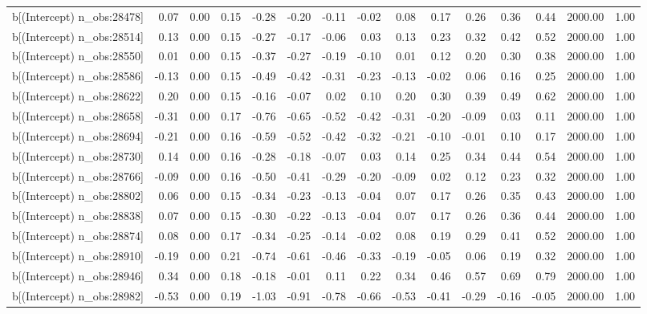 \begin{table}[ht]
\begin{tabular}{rrrrrrrrrrrrrrr}
  b[(Intercept) n\_obs:28478] & 0.07 & 0.00 & 0.15 & -0.28 & -0.20 & -0.11 & -0.02 & 0.08 & 0.17 & 0.26 & 0.36 & 0.44 & 2000.00 & 1.00 \\ 
  b[(Intercept) n\_obs:28514] & 0.13 & 0.00 & 0.15 & -0.27 & -0.17 & -0.06 & 0.03 & 0.13 & 0.23 & 0.32 & 0.42 & 0.52 & 2000.00 & 1.00 \\ 
  b[(Intercept) n\_obs:28550] & 0.01 & 0.00 & 0.15 & -0.37 & -0.27 & -0.19 & -0.10 & 0.01 & 0.12 & 0.20 & 0.30 & 0.38 & 2000.00 & 1.00 \\ 
  b[(Intercept) n\_obs:28586] & -0.13 & 0.00 & 0.15 & -0.49 & -0.42 & -0.31 & -0.23 & -0.13 & -0.02 & 0.06 & 0.16 & 0.25 & 2000.00 & 1.00 \\ 
  b[(Intercept) n\_obs:28622] & 0.20 & 0.00 & 0.15 & -0.16 & -0.07 & 0.02 & 0.10 & 0.20 & 0.30 & 0.39 & 0.49 & 0.62 & 2000.00 & 1.00 \\ 
  b[(Intercept) n\_obs:28658] & -0.31 & 0.00 & 0.17 & -0.76 & -0.65 & -0.52 & -0.42 & -0.31 & -0.20 & -0.09 & 0.03 & 0.11 & 2000.00 & 1.00 \\ 
  b[(Intercept) n\_obs:28694] & -0.21 & 0.00 & 0.16 & -0.59 & -0.52 & -0.42 & -0.32 & -0.21 & -0.10 & -0.01 & 0.10 & 0.17 & 2000.00 & 1.00 \\ 
  b[(Intercept) n\_obs:28730] & 0.14 & 0.00 & 0.16 & -0.28 & -0.18 & -0.07 & 0.03 & 0.14 & 0.25 & 0.34 & 0.44 & 0.54 & 2000.00 & 1.00 \\ 
  b[(Intercept) n\_obs:28766] & -0.09 & 0.00 & 0.16 & -0.50 & -0.41 & -0.29 & -0.20 & -0.09 & 0.02 & 0.12 & 0.23 & 0.32 & 2000.00 & 1.00 \\ 
  b[(Intercept) n\_obs:28802] & 0.06 & 0.00 & 0.15 & -0.34 & -0.23 & -0.13 & -0.04 & 0.07 & 0.17 & 0.26 & 0.35 & 0.43 & 2000.00 & 1.00 \\ 
  b[(Intercept) n\_obs:28838] & 0.07 & 0.00 & 0.15 & -0.30 & -0.22 & -0.13 & -0.04 & 0.07 & 0.17 & 0.26 & 0.36 & 0.44 & 2000.00 & 1.00 \\ 
  b[(Intercept) n\_obs:28874] & 0.08 & 0.00 & 0.17 & -0.34 & -0.25 & -0.14 & -0.02 & 0.08 & 0.19 & 0.29 & 0.41 & 0.52 & 2000.00 & 1.00 \\ 
  b[(Intercept) n\_obs:28910] & -0.19 & 0.00 & 0.21 & -0.74 & -0.61 & -0.46 & -0.33 & -0.19 & -0.05 & 0.06 & 0.19 & 0.32 & 2000.00 & 1.00 \\ 
  b[(Intercept) n\_obs:28946] & 0.34 & 0.00 & 0.18 & -0.18 & -0.01 & 0.11 & 0.22 & 0.34 & 0.46 & 0.57 & 0.69 & 0.79 & 2000.00 & 1.00 \\ 
  b[(Intercept) n\_obs:28982] & -0.53 & 0.00 & 0.19 & -1.03 & -0.91 & -0.78 & -0.66 & -0.53 & -0.41 & -0.29 & -0.16 & -0.05 & 2000.00 & 1.00 \\ 

\end{tabular}
\end{table}
